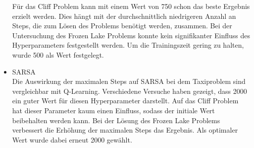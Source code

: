 \begin{itemize}
    Für das Cliff Problem kann mit einem Wert von 750 schon das beste Ergebnis erzielt werden. 
    Dies hängt mit der durchschnittlich niedrigeren Anzahl an Steps, die zum Lösen des Problems benötigt werden, zusammen. 
    Bei der Untersuchung des Frozen Lake Problems konnte kein signifikanter Einfluss des Hyperparameters festgestellt werden. Um die Trainingszeit gering zu halten, wurde 500 als Wert festgelegt.
    \item SARSA\\
    Die Auswirkung der maximalen Steps auf SARSA bei dem Taxiproblem sind vergleichbar mit Q-Learning. Verschiedene Versuche haben gezeigt, dass 2000 ein guter Wert für diesen Hyperparameter darstellt.
    Auf das Cliff Problem hat dieser Parameter kaum einen Einfluss, sodass der initiale Wert beibehalten werden kann.
    Bei der Lösung des Frozen Lake Problems verbessert die Erhöhung der maximalen Steps das Ergebnis. Als optimaler Wert wurde dabei erneut 2000 gewählt.
\end{itemize}
